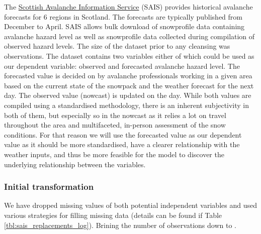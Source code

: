 \documentclass{article}
\begin{document}
	The \href{https://www.sais.gov.uk/forecast-archive/}{Scottish Avalanche Information Service} (SAIS) provides historical avalanche forecasts for 6 regions in Scotland. The forecasts are typically published from December to April. SAIS allows bulk download of snowprofile data containing avalanche hazard level as well as snowprofile data collected during compilation of observed hazard levels. The size of the dataset prior to any cleansing was observations.
	\newline
	The dataset contains two variables either of which could be used as our dependent variable: observed and forecasted avalanche hazard level.
	The forecasted value is decided on by avalanche professionals working in a given area based on the current state of the snowpack and the weather forecast for the next day.
	The observed value (nowcast) is updated on the day.
	\newline
	While both values are compiled using a standardised methodology, there is an inherent subjectivity in both of them, but especially so in the nowcast as it relies a lot on travel throughout the area and multifaceted, in-person assessment of the snow conditions. For that reason we will use the forecasted value as our dependent value as it should be more standardised, have a clearer relationship with the weather inputs, and thus be more feasible for the model to discover the underlying relationship between the variables.

\subsubsection{Initial transformation}
	We have dropped missing values of both potential independent variables and used various strategies for filling missing data (details can be found if Table \ref{tbl:sais_replacements_log}). Brining the number of observations down to \unskip.
\end{document}
